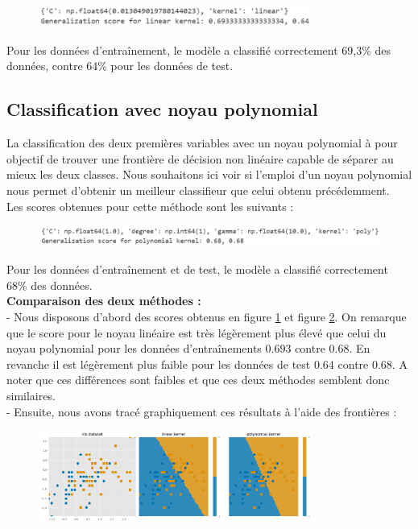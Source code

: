 \documentclass[a4paper,12pt]{article}
\begin{document}
\begin{figure}[h!]
    \centering
    \includegraphics[width=0.8\textwidth]{Images/linear_score.png}
    \caption{}
    \label{fig:linear}
\end{figure}

Pour les données d'entraînement, le modèle a classifié correctement 69,3\% des données, contre 64\% pour les données de test. 


\subsection{Classification avec noyau polynomial}

La classification des deux premières variables avec un noyau polynomial à pour objectif de trouver une frontière de décision non linéaire capable de séparer au mieux les deux classes. 
Nous souhaitons ici voir si l'emploi d'un noyau polynomial nous permet d'obtenir un meilleur classifieur que celui obtenu précédemment.\\
Les scores obtenues pour cette méthode sont les suivants :

\begin{figure}[h!]
    \centering
    \includegraphics[width=\textwidth]{Images/poly_score.png}
    \caption{}
    \label{fig:poly}
\end{figure}

Pour les données d'entraînement et de test, le modèle a classifié correctement 68\% des données. \\

\textbf{Comparaison des deux méthodes :}\\[0.5cm]
- Nous disposons d'abord des scores obtenus en figure \ref{fig:linear} et figure \ref{fig:poly}.
On remarque que le score pour le noyau linéaire est très légèrement plus élevé que celui du noyau polynomial pour les données d'entraînements $0.693$ contre $0.68$.
En revanche il est légèrement plus faible pour les données de test $0.64$ contre $0.68$. A noter que ces différences sont faibles et que ces deux méthodes semblent donc similaires.\\

- Ensuite, nous avons tracé graphiquement ces résultats à l'aide des frontières : \\
\begin{figure}[h!]
    \centering
    \includegraphics[width=0.8\textwidth]{Images/linear_vs_poly.png}
    \caption{}
    \label{fig:compare}
\end{figure}
\end{document}
